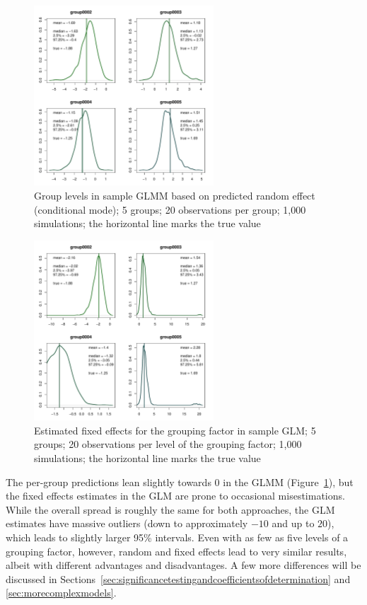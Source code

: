 \documentclass[a4paper,12pt]{article}
\begin{document}
\begin{figure}[!htpb]
  \centering
  \includegraphics[width=0.6\textwidth]{graphics/glmmj5i20}
  \caption{Group levels in sample GLMM based on predicted random effect (conditional mode); 5 groups; 20 observations per group; 1,000 simulations; the horizontal line marks the true value}
  \label{fig:glmmj5i20}
\end{figure}
\begin{figure}[!htpb]
  \centering
  \includegraphics[width=0.6\textwidth]{graphics/glmj5i20}
  \caption{Estimated fixed effects for the grouping factor in sample GLM; 5 groups; 20 observations per level of the grouping factor; 1,000 simulations; the horizontal line marks the true value}
  \label{fig:glmj5i20}
\end{figure}

The per-group predictions lean slightly towards $0$ in the GLMM (Figure~\ref{fig:glmmj5i20}), but the fixed effects estimates in the GLM are prone to occasional misestimations.
While the overall spread is roughly the same for both approaches, the GLM estimates have massive outliers (down to approximately $-10$ and up to $20$), which leads to slightly larger 95\% intervals.
Even with as few as five levels of a grouping factor, however, random and fixed effects lead to very similar results, albeit with different advantages and disadvantages.
A few more differences will be discussed in Sections~\ref{sec:significancetestingandcoefficientsofdetermination} and \ref{sec:morecomplexmodels}.
\end{document}
